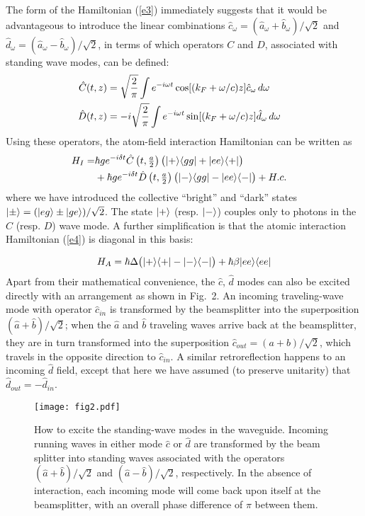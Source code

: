\documentclass[aps,pra,twocolumn,floatfix,superscriptaddress]{revtex4}
\begin{document}
The form of the Hamiltonian (\ref{e3}) immediately suggests that it would be advantageous to introduce the linear combinations $\hat c_\omega = (\hat a_\omega+\hat b_\omega)/\sqrt 2$ and $\hat d_\omega = (\hat a_\omega-\hat b_\omega)/\sqrt 2$, in terms of which operators $C$ and $D$, associated with standing wave modes, can be defined:
\begin{align}
\hat C(t,z) &= \sqrt{\frac 2 \pi} \int e^{-i\omega t}\cos[(k_F +\omega/c)z] \hat c_\omega \, d\omega \cr
\hat D(t,z) &= -i\sqrt{\frac 2 \pi} \int e^{-i\omega t}\sin[(k_F +\omega/c)z] \hat d_\omega \, d\omega 
\label{e5}
\end{align}  
Using these operators, the atom-field interaction Hamiltonian can be written as
\begin{align}
H_I = &\hbar g e^{-i\delta t}\hat C\left(t,\tfrac{a}{2}\right)\bigl(|+\rangle  \langle gg| + |ee\rangle \langle+| \bigr) \cr
&+\hbar g e^{-i\delta t} \hat D\left(t,\tfrac{a}{2}\right)\bigl(|-\rangle  \langle gg| - |ee\rangle \langle-| \bigr) + H.c.
\label{e6}
\end{align}
where we have introduced the collective ``bright'' and ``dark'' states $|\pm\rangle = (|eg\rangle\pm|ge\rangle)/\sqrt 2$.  The state $|+\rangle$ (resp. $|-\rangle$) couples only to photons in the $C$ (resp. $D$) wave mode.  A further simplification is that the atomic interaction Hamiltonian (\ref{e4}) is  diagonal in this basis:

\begin{equation}
H_A = \hbar\Delta \bigl(|+\rangle\langle+| - |-\rangle\langle-|\bigr) +  \hbar\beta|ee\rangle\langle ee|
\label{e7}
\end{equation}
Apart from their mathematical convenience, the $\hat c$, $\hat d$ modes can also be excited directly with an arrangement as shown in Fig.~2.  An incoming traveling-wave mode with operator $\hat c_{in}$ is transformed by the beamsplitter into the superposition $(\hat a+\hat b)/\sqrt 2$; when the $\hat a$ and $\hat b$ traveling waves arrive back at the beamsplitter, they are in turn transformed into the superposition $\hat c_{out} = (a+b)/\sqrt 2$, which travels in the opposite direction to $\hat c_{in}$.  A similar retroreflection happens to an incoming $\hat d$ field, except that here we have assumed (to preserve unitarity) that $\hat d_{out} = -\hat d_{in}$.

\begin{figure}
\texttt{[image: fig2.pdf]}
\caption{\label{fig2} How to excite the standing-wave modes in the waveguide. Incoming running waves in either mode $\hat c$ or $\hat d$ are transformed by the beam splitter into standing waves associated with the operators $(\hat a + \hat b)/\sqrt 2$ and $(\hat a - \hat b)/\sqrt 2$, respectively.  In the absence of interaction, each incoming mode will come back upon itself at the beamsplitter, with an overall phase difference of $\pi$ between them.}
\end{figure}
\end{document}

